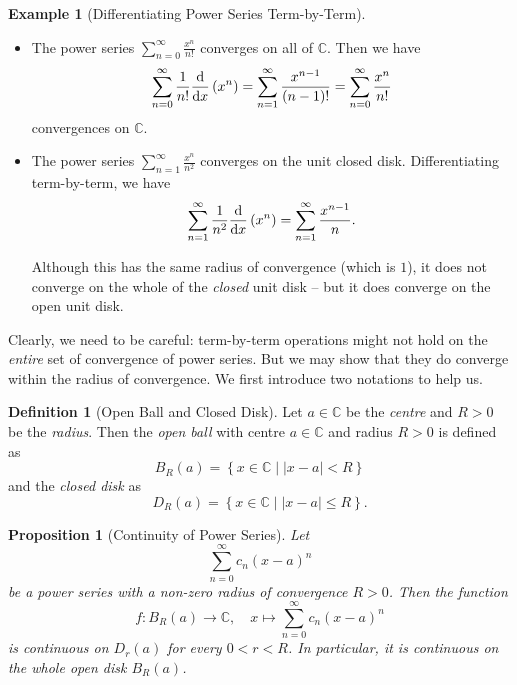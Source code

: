 \documentclass[11pt]{article}
\numberwithin{equation}{section}
\newtheorem{proposition}[theorem]{Proposition}
\theoremstyle{definition}
\newtheorem{definition}[theorem]{Definition}
\newtheorem{example}[theorem]{Example}
\theoremstyle{remark}
\newcommand{\pqty}[1]{\left(#1\right)}
\newcommand{\abs}[1]{\left|#1\right|}
\newcommand{\set}[2]{\left\{#1\mid #2\right\}}
\newcommand{\function}[5]{#1:#2\to #3,\quad #4\mapsto #5}
\newcommand{\CC}{\mathbb C}
\begin{document}
\begin{example}[Differentiating Power Series Term-by-Term]\label{analysis-unit-0211}
    \label{ex:differentiating-power-series-term-by-term}%
    \begin{itemize}
        \item The power series \(\sum_{n = 0}^{\infty} \frac{x^n}{n!}\) converges on all of \(\CC\). Then we have
        \[
            \sum_{n = 0}^{\infty} \frac{1}{n!} \dv{x} \pqty{x^n} = \sum_{n = 1}^{\infty} \frac{x^{n - 1}}{\pqty{n - 1}!} = \sum_{n = 0}^{\infty} \frac{x^n}{n!}
        \]
        convergences on \(\CC\).

        \item The power series \(\sum_{n = 1}^{\infty} \frac{x^n}{n^2}\) converges on the unit closed disk. Differentiating term-by-term, we have
        \[
            \sum_{n = 1}^{\infty} \frac{1}{n^2} \dv{x} \pqty{x^n} = \sum_{n = 1}^{\infty} \frac{x^{n - 1}}{n}.
        \]

        Although this has the same radius of convergence (which is \(1\)), it does not converge on the whole of the \emph{closed} unit disk -- but it does converge on the open unit disk.
    \end{itemize}
\end{example}

Clearly, we need to be careful: term-by-term operations might not hold on the \emph{entire} set of convergence of power series. But we may show that they do converge within the radius of convergence. We first introduce two notations to help us. 

\begin{definition}[Open Ball and Closed Disk]\label{analysis-unit-0212}
    \label{def:open-ball-closed-disk}%
    Let \(a \in \CC\) be the \emph{centre} and \(R > 0\) be the \emph{radius}. Then the \emph{open ball} with centre \(a \in \CC\) and radius \(R > 0\) is defined as
    \[
        B_R \pqty{a} = \set{x \in \CC}{\abs{x - a} < R}
    \]
    and the \emph{closed disk} as
    \[
        D_R \pqty{a} = \set{x \in \CC}{\abs{x - a} \leq R}.
    \]
\end{definition}

\begin{proposition}[Continuity of Power Series]\label{analysis-unit-0213}
    \label{prop:continuity-of-power-series}%
    Let
    \[
        \sum_{n = 0}^{\infty} c_n \pqty{x - a}^{n}
    \]
    be a power series with a non-zero radius of convergence \(R > 0\). Then the function
    \[
        \function{f}{B_R \pqty{a}}{\CC}{x}{\sum_{n = 0}^{\infty} c_n \pqty{x - a}^n}
    \]
    is continuous on \(D_r(a)\) for every \(0<r<R\). In particular, it is continuous on the whole open disk \(B_R(a)\).
\end{proposition}
\end{document}
